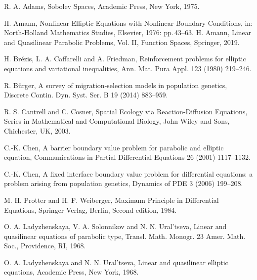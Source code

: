 \documentclass[twoside,10pt]{article}
\numberwithin{equation}{section}
\begin{document}
\begin{thebibliography}{100}\setlength{\itemsep}{-0.5mm}


\newblock R. A. Adams,
\newblock Sobolev Spaces,
\newblock Academic Press, New York, 1975.

\newblock H. Amann,
\newblock Nonlinear Elliptic Equations with Nonlinear Boundary Conditions,
\newblock in: North-Holland Mathematics Studies, Elsevier, 1976: pp.\,43--63.
\newblock H. Amann,
\newblock Linear and Quasilinear Parabolic Problems, Vol. II, Function Spaces,
\newblock Springer, 2019.


\newblock H. Br\'ezis, L. A. Caffarelli and A. Friedman, Reinforcement problems for elliptic equations and variational inequalities,
\newblock Ann. Mat. Pura Appl. 123 (1980) 219--246.


\newblock R. B\"urger,
\newblock A survey of migration-selection models in population genetics,
\newblock Discrete Contin. Dyn. Syst. Ser. B 19 (2014) 883--959.



R. S. Cantrell and C. Cosner, Spatial Ecology via Reaction-Diffusion Equations, Series in
Mathematical and Computational Biology, John Wiley and Sons, Chichester, UK, 2003.



\newblock C.-K. Chen,
\newblock A barrier boundary value problem for parabolic and elliptic equation,
\newblock Communications in Partial Differential Equations 26 (2001) 1117--1132.

\newblock C.-K. Chen,
\newblock A fixed interface boundary value problem for differential equations: a problem arising from population genetics,
\newblock Dynamics of PDE 3 (2006) 199--208.


\newblock M. H. Protter and H. F. Weiberger,
\newblock Maximum Principle in Differential Equations,
\newblock Springer-Verlag, Berlin, Second edition, 1984.


\newblock O. A. Ladyzhenskaya, V. A. Solonnikov and N. N. Ural'tseva,
\newblock Linear and quasilinear equations of parabolic type,
\newblock Transl. Math. Monogr. 23 Amer. Math. Soc., Providence, RI, 1968.

\newblock O. A. Ladyzhenskaya and N. N. Ural'tseva,
\newblock Linear and quasilinear elliptic equations,
\newblock Academic Press, New York, 1968.










\end{thebibliography}
\end{document}
